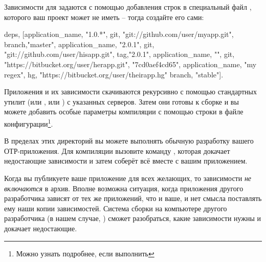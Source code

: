 \documentclass[11pt, oneside]{book}   	%
\begin{document}
Зависимости для  задаются с помощью добавления строк в специальный файл , которого ваш проект может не иметь -- тогда создайте его сами:

\begin{VerbatimText}
{deps,
 [{application_name, "1.0.*",
   {git, "git://github.com/user/myapp.git", {branch,"master"}}},
  {application_name, "2.0.1",
   {git, "git://github.com/user/hisapp.git", {tag,"2.0.1"}}},
  {application_name, "", 
   {git, "https://bitbucket.org/user/herapp.git",  "7cd0aef4cd65"}},
  {application_name, "my regex",
   {hg, "https://bitbucket.org/user/theirapp.hg" {branch, "stable"}}}]}.
\end{VerbatimText}

Приложения и их зависимости скачиваются рекурсивно с помощью стандартных утилит  (или , или ) с указанных серверов. Затем они готовы к сборке и вы можете добавить особые параметры компиляции с помощью строки  в файле конфигурации\footnote{Можно узнать подробнее, если выполнить }.

В пределах этих директорий вы можете выполнять обычную разработку вашего ОТР-приложения. Для компиляции вызовите команду , которая докачает недостающие зависимости и затем соберёт всё вместе с вашим приложением.

Когда вы публикуете ваше приложение для всех желающих, то зависимости \emph{не включаются} в архив. Вполне возможна ситуация, когда приложения другого разработчика зависят от тех же приложений, что и ваше, и нет смысла поставлять ему наши копии зависимостей. Система сборки на компьютере другого разработчика (в нашем случае, ) сможет разобраться, какие зависимости нужны и докачает недостающие.
\end{document}
